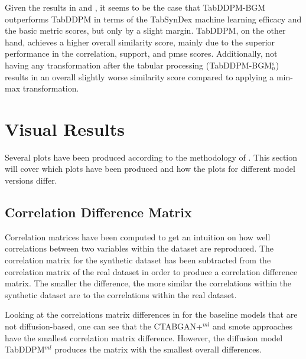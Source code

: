 Given the results in  and , it seems to be the case that TabDDPM-BGM outperforms TabDDPM in terms of the TabSynDex machine learning efficacy and the basic metric scores, but only by a slight margin.
TabDDPM, on the other hand, achieves a higher overall similarity score, mainly due to the superior performance in the correlation, support, and \gls{pmse} scores.
Additionally, not having any transformation after the tabular processing (TabDDPM-BGM$^{s}_{n}$) results in an overall slightly worse similarity score compared to applying a min-max transformation.
\newpage
\section{Visual Results}
\label{ch:results-Visual}

Several plots have been produced according to the methodology of \cite{brenninkmeijer2019GenerationEvaluationTabular}.
This section will cover which plots have been produced and how the plots for different \gls{model} versions differ.

\subsection{Correlation Difference Matrix}

Correlation matrices have been computed to get an intuition on how well correlations between two variables within the dataset are reproduced.
The correlation matrix for the synthetic dataset has been subtracted from the correlation matrix of the real dataset in order to produce a correlation difference matrix.
The smaller the difference, the more similar the correlations within the synthetic dataset are to the correlations within the real dataset.

Looking at the correlations matrix differences in  for the baseline models that are not diffusion-based, one can see that the CTABGAN+$^{ml}$ and \gls{smote} approaches have the smallest
correlation matrix difference.
However, the diffusion \gls{model} TabDDPM$^{ml}$ produces the matrix with the smallest overall differences.

